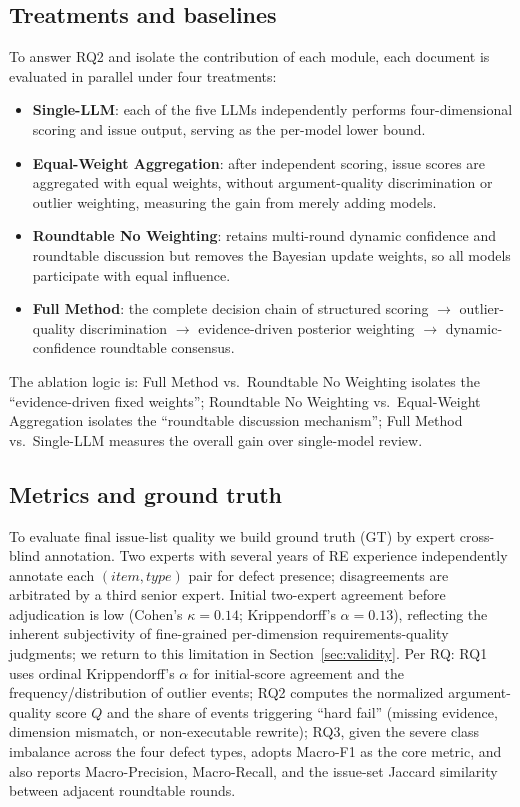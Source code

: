 \documentclass[sn-mathphys-num]{sn-jnl}
\begin{document}


\subsection{Treatments and baselines}\label{sec:treatments}
To answer RQ2 and isolate the contribution of each module, each document is evaluated in parallel under four treatments:
\begin{itemize}
\item \textbf{Single-LLM}: each of the five LLMs independently performs four-dimensional scoring and issue output, serving as the per-model lower bound.
\item \textbf{Equal-Weight Aggregation}: after independent scoring, issue scores are aggregated with equal weights, without argument-quality discrimination or outlier weighting, measuring the gain from merely adding models.
\item \textbf{Roundtable No Weighting}: retains multi-round dynamic confidence and roundtable discussion but removes the Bayesian update weights, so all models participate with equal influence.
\item \textbf{Full Method}: the complete decision chain of structured scoring $\to$ outlier-quality discrimination $\to$ evidence-driven posterior weighting $\to$ dynamic-confidence roundtable consensus.
\end{itemize}
The ablation logic is: Full Method vs.\ Roundtable No Weighting isolates the ``evidence-driven fixed weights''; Roundtable No Weighting vs.\ Equal-Weight Aggregation isolates the ``roundtable discussion mechanism''; Full Method vs.\ Single-LLM measures the overall gain over single-model review.



\subsection{Metrics and ground truth}\label{sec:metrics}
To evaluate final issue-list quality we build ground truth (GT) by expert cross-blind annotation. Two experts with several years of RE experience independently annotate each $(item,type)$ pair for defect presence; disagreements are arbitrated by a third senior expert. Initial two-expert agreement before adjudication is low (Cohen's $\kappa=0.14$; Krippendorff's $\alpha=0.13$), reflecting the inherent subjectivity of fine-grained per-dimension requirements-quality judgments; we return to this limitation in Section~\ref{sec:validity}. Per RQ: RQ1 uses ordinal Krippendorff's $\alpha$ for initial-score agreement and the frequency/distribution of outlier events; RQ2 computes the normalized argument-quality score $Q$ and the share of events triggering ``hard fail'' (missing evidence, dimension mismatch, or non-executable rewrite); RQ3, given the severe class imbalance across the four defect types, adopts Macro-F1 as the core metric, and also reports Macro-Precision, Macro-Recall, and the issue-set Jaccard similarity between adjacent roundtable rounds.
\end{document}
